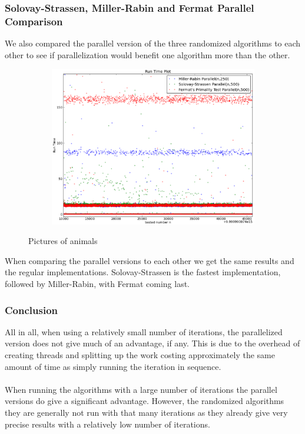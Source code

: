 \documentclass[compressed,final,notitlepage,narroweqnarray,inline,twoside,]{ieee}
\begin{document}
\subsubsection{Solovay-Strassen, Miller-Rabin and Fermat Parallel Comparison}
We also compared the parallel version of the three randomized algorithms to each other to see if parallelization would benefit one algorithm more than the other.
\begin{figure}[H]
        \centering
        \begin{subfigure}[b]{0.5\textwidth}
                \includegraphics[width=\textwidth]{../images/compare_parallel_runtime}
                \label{fig:gull}
        \end{subfigure}
        \caption{Pictures of animals}\label{fig:animals}
\end{figure}
When comparing the parallel versions to each other we get the same results and the regular implementations. Solovay-Strassen is the fastest implementation, followed by Miller-Rabin, with Fermat coming last.
\subsubsection{Conclusion}
All in all, when using a relatively small number of iterations, the parallelized version does not give much of an advantage, if any. This is due to the overhead of creating threads and splitting up the work costing approximately the same amount of time as simply running the iteration in sequence.\\\\ When running the algorithms with a large number of iterations the parallel versions do give a significant advantage. However, the randomized algorithms they are generally not run with that many iterations as they already give very precise results with a relatively low number of iterations.
\end{document}
